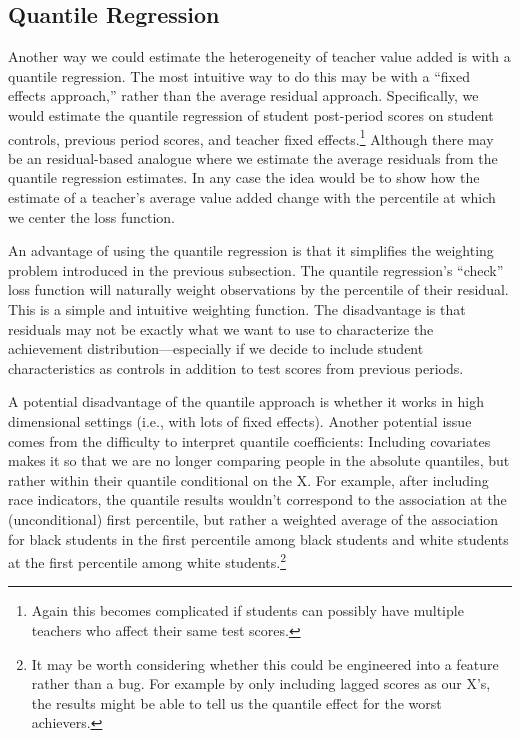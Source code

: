 \documentclass[letterpaper,12pt]{article}
\begin{document}
\subsection{Quantile Regression}
Another way we could estimate the heterogeneity of teacher value added is with a quantile regression. The most intuitive way to do this may be with a ``fixed effects approach,'' rather than the average residual approach. Specifically, we would estimate the quantile regression of student post-period scores on student controls, previous period scores, and teacher fixed effects.\footnote{Again this becomes complicated if students can possibly have multiple teachers who affect their same test scores.} Although there may be an residual-based analogue where we estimate the average residuals from the quantile regression estimates. In any case the idea would be to show how the estimate of a teacher's average value added change with the percentile at which we center the loss function. 

An advantage of using the quantile regression is that it simplifies the weighting problem introduced in the previous subsection. The quantile regression's ``check'' loss function will naturally weight observations by the percentile of their residual. This is a simple and intuitive weighting function. The disadvantage is that residuals may not be exactly what we want to use to characterize the achievement distribution---especially if we decide to include student characteristics as controls in addition to test scores from previous periods.

A potential disadvantage of the quantile approach is whether it works in high dimensional settings (i.e., with lots of fixed effects). Another potential issue comes from the difficulty to interpret quantile coefficients: Including covariates makes it so that we are no longer comparing people in the absolute quantiles, but rather within their quantile conditional on the X. For example, after including race indicators, the quantile results wouldn't correspond to the association at the (unconditional) first percentile, but rather a weighted average of the association for black students in the first percentile among black students and white students at the first percentile among white students.\footnote{It may be worth considering whether this could be engineered into a feature rather than a bug. For example by only including lagged scores as our X's, the results might be able to tell us the quantile effect for the worst achievers.}
\end{document}
